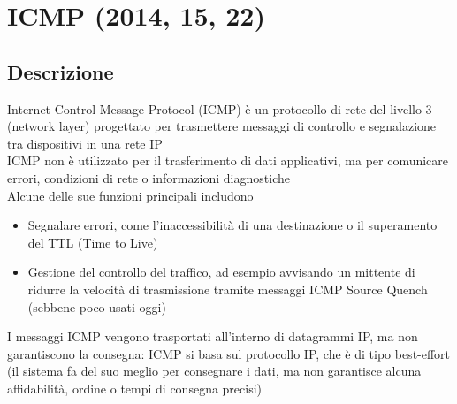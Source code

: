 \documentclass[10pt,oneside,a4paper]{article}
\begin{document}
\section{ICMP (2014, 15, 22)}
\subsection{Descrizione}
Internet Control Message Protocol (ICMP) è un protocollo di rete del livello 3 (network layer) progettato per trasmettere messaggi di controllo e segnalazione tra dispositivi in una rete IP\\
ICMP non è utilizzato per il trasferimento di dati applicativi, ma per comunicare errori, condizioni di rete o informazioni diagnostiche\\
Alcune delle sue funzioni principali includono
\begin{itemize}
\item Segnalare errori, come l'inaccessibilità di una destinazione o il superamento del TTL (Time to Live)
\item Gestione del controllo del traffico, ad esempio avvisando un mittente di ridurre la velocità di trasmissione tramite messaggi ICMP Source Quench (sebbene poco usati oggi)
\end{itemize}
I messaggi ICMP vengono trasportati all'interno di datagrammi IP, ma non garantiscono la consegna: ICMP si basa sul protocollo IP, che è di tipo best-effort (il sistema fa del suo meglio per consegnare i dati, ma non garantisce alcuna affidabilità, ordine o tempi di consegna precisi)
\end{document}
